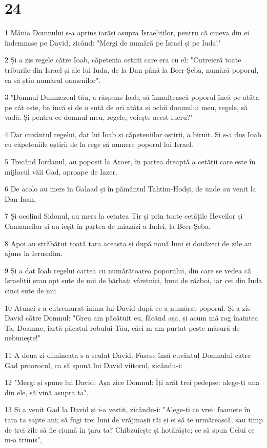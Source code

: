 \chapter{24}

\par 1 Mânia Domnului s-a aprins iarăși asupra Israeliților, pentru că cineva din ei îndemnase pe David, zicând: "Mergi de numără pe Israel și pe Iuda!"
\par 2 Și a zis regele către Ioab, căpetenia oștirii care era cu el: "Cutreieră toate triburile din Israel și ale lui Iuda, de la Dan până la Beer-Șeba, numără poporul, ca să știu numărul oamenilor".
\par 3 "Domnul Dumnezeul tău, a răspuns Ioab, să înmulțească poporul încă pe atâta pe cât este, ba încă și de o sută de ori atâta și ochii domnului meu, regele, să vadă. Și pentru ce domnul meu, regele, voiește acest lucru?"
\par 4 Dar cuvântul regelui, dat lui Ioab și căpeteniilor oștirii, a biruit. Și s-a dus Ioab cu căpeteniile oștirii de la rege să numere poporul lui Israel.
\par 5 Trecând Iordanul, au poposit la Aroer, în partea dreaptă a cetății care este în mijlocul văii Gad, aproape de Iazer.
\par 6 De acolo au mers în Galaad și în pământul Tahtim-Hodși, de unde au venit la Dan-Iaan,
\par 7 Și ocolind Sidonul, au mers la cetatea Tir și prin toate cetățile Heveilor și Canaaneilor și au ieșit în partea de miazăzi a Iudei, la Beer-Șeba.
\par 8 Apoi au străbătut toată țara aceasta și după nouă luni și douăzeci de zile au ajuns la Ierusalim.
\par 9 Și a dat Ioab regelui cartea cu numărătoarea poporului, din care se vedea că Israeliții erau opt sute de mii de bărbați vârstnici, buni de război, iar cei din Iuda cinci sute de mii.
\par 10 Atunci s-a cutremurat inima lui David după ce a numărat poporul. Și a zis David către Domnul: "Greu am păcătuit eu, făcând așa, și acum mă rog înaintea Ta, Doamne, iartă păcatul robului Tău, căci m-am purtat peste măsură de nebunește!"
\par 11 A doua zi dimineața s-a sculat David. Fusese însă cuvântul Domnului către Gad proorocul, ca să spună lui David viitorul, zicându-i:
\par 12 "Mergi și spune lui David: Așa zice Domnul: Îți arăt trei pedepse: alege-ți una din ele, să vină asupra ta".
\par 13 Și a venit Gad la David și i-a vestit, zicându-i: "Alege-ți ce vrei: foamete în țara ta șapte ani; să fugi trei luni de vrăjmașii tăi și ei să te urmărească; sau timp de trei zile să fie ciumă în țara ta? Chibzuiește și hotărăște; ce să spun Celui ce m-a trimis",
